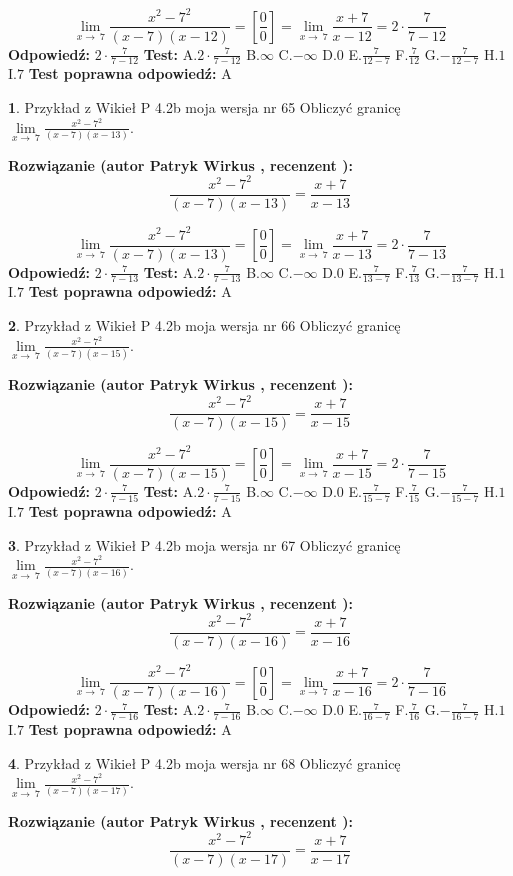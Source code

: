 \documentclass[12pt, a4paper]{article}
\theoremstyle{definition} %
\newtheorem{zad}{}
\newcommand{\zadStart}[1]{\begin{zad}#1\newline}
\newcommand{\zadStop}{\end{zad}}
\newcommand{\rozwStart}[2]{\noindent \textbf{Rozwiązanie (autor #1 , recenzent #2): }\newline}
\newcommand{\rozwStop}{\newline}
\newcommand{\odpStart}{\noindent \textbf{Odpowiedź:}\newline}
\newcommand{\odpStop}{\newline}
\newcommand{\testStart}{\noindent \textbf{Test:}\newline}
\newcommand{\testStop}{\newline}
\newcommand{\kluczStart}{\noindent \textbf{Test poprawna odpowiedź:}\newline}
\newcommand{\kluczStop}{\newline}
\begin{document}
$$\lim\limits_{x\to\ 7}\frac{x^{2}-7^{2}}{(x-7)(x-12)}=[\frac{0}{0}]=\lim\limits_{x\to\ 7}\frac{x+7}{x-12}=2 \cdot \frac{7}{7-12}$$
\rozwStop
\odpStart
$2 \cdot \frac{7}{7-12}$
\odpStop
\testStart
A.$2 \cdot \frac{7}{7-12}$
B.$\infty$
C.$-\infty$
D.$0$
E.$\frac{7}{12-7}$
F.$\frac{7}{12}$
G.$-\frac{7}{12-7}$
H.$1$
I.$7$
\testStop
\kluczStart
A
\kluczStop



\zadStart{Przykład z Wikieł P 4.2b moja wersja nr 65}
Obliczyć granicę $\lim\limits_{x\to\ 7}\frac{x^{2}-7^{2}}{(x-7)(x-13)}$.
\zadStop
\rozwStart{Patryk Wirkus}{}
$$\frac{x^{2}-7^{2}}{(x-7)(x-13)}=\frac{x+7}{x-13}$$

$$\lim\limits_{x\to\ 7}\frac{x^{2}-7^{2}}{(x-7)(x-13)}=[\frac{0}{0}]=\lim\limits_{x\to\ 7}\frac{x+7}{x-13}=2 \cdot \frac{7}{7-13}$$
\rozwStop
\odpStart
$2 \cdot \frac{7}{7-13}$
\odpStop
\testStart
A.$2 \cdot \frac{7}{7-13}$
B.$\infty$
C.$-\infty$
D.$0$
E.$\frac{7}{13-7}$
F.$\frac{7}{13}$
G.$-\frac{7}{13-7}$
H.$1$
I.$7$
\testStop
\kluczStart
A
\kluczStop



\zadStart{Przykład z Wikieł P 4.2b moja wersja nr 66}
Obliczyć granicę $\lim\limits_{x\to\ 7}\frac{x^{2}-7^{2}}{(x-7)(x-15)}$.
\zadStop
\rozwStart{Patryk Wirkus}{}
$$\frac{x^{2}-7^{2}}{(x-7)(x-15)}=\frac{x+7}{x-15}$$

$$\lim\limits_{x\to\ 7}\frac{x^{2}-7^{2}}{(x-7)(x-15)}=[\frac{0}{0}]=\lim\limits_{x\to\ 7}\frac{x+7}{x-15}=2 \cdot \frac{7}{7-15}$$
\rozwStop
\odpStart
$2 \cdot \frac{7}{7-15}$
\odpStop
\testStart
A.$2 \cdot \frac{7}{7-15}$
B.$\infty$
C.$-\infty$
D.$0$
E.$\frac{7}{15-7}$
F.$\frac{7}{15}$
G.$-\frac{7}{15-7}$
H.$1$
I.$7$
\testStop
\kluczStart
A
\kluczStop



\zadStart{Przykład z Wikieł P 4.2b moja wersja nr 67}
Obliczyć granicę $\lim\limits_{x\to\ 7}\frac{x^{2}-7^{2}}{(x-7)(x-16)}$.
\zadStop
\rozwStart{Patryk Wirkus}{}
$$\frac{x^{2}-7^{2}}{(x-7)(x-16)}=\frac{x+7}{x-16}$$

$$\lim\limits_{x\to\ 7}\frac{x^{2}-7^{2}}{(x-7)(x-16)}=[\frac{0}{0}]=\lim\limits_{x\to\ 7}\frac{x+7}{x-16}=2 \cdot \frac{7}{7-16}$$
\rozwStop
\odpStart
$2 \cdot \frac{7}{7-16}$
\odpStop
\testStart
A.$2 \cdot \frac{7}{7-16}$
B.$\infty$
C.$-\infty$
D.$0$
E.$\frac{7}{16-7}$
F.$\frac{7}{16}$
G.$-\frac{7}{16-7}$
H.$1$
I.$7$
\testStop
\kluczStart
A
\kluczStop



\zadStart{Przykład z Wikieł P 4.2b moja wersja nr 68}
Obliczyć granicę $\lim\limits_{x\to\ 7}\frac{x^{2}-7^{2}}{(x-7)(x-17)}$.
\zadStop
\rozwStart{Patryk Wirkus}{}
$$\frac{x^{2}-7^{2}}{(x-7)(x-17)}=\frac{x+7}{x-17}$$
\end{document}
